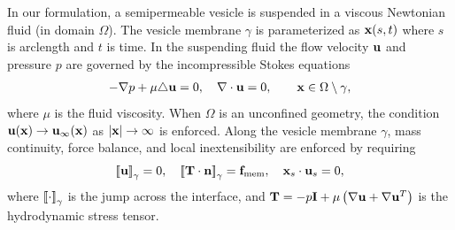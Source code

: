 \documentclass[prb,preprint,showpacs,preprintnumbers,amsmath,amssymb,longbibliography]{revtex4-1}
\begin{document}

In our formulation, a semipermeable vesicle is suspended in a viscous
Newtonian fluid (in domain $\Omega$).  The vesicle membrane $\gamma$ is
parameterized as $\mathbf{x}(s,t)$ where $s$ is arclength and $t$ is time. In
the suspending fluid the flow velocity $\mathbf{u}$ and pressure $p$ are
governed by the incompressible Stokes equations
\begin{align}
  \label{eqn:governing}
  -\nabla p + \mu \triangle \mathbf{u} = 0, \quad
  \nabla \cdot \mathbf{u} = 0, \qquad \mathbf{x} \in \Omega \setminus \gamma,
\end{align}
where $\mu$ is the fluid viscosity. When $\Omega$ is an unconfined
geometry, the condition $\mathbf{u}(\mathbf{x}) \rightarrow \mathbf{u}_\infty(\mathbf{x})$ as $|\mathbf{x}|
\rightarrow \infty$ is enforced. 
%
Along the vesicle membrane $\gamma$,
mass continuity, force balance, and local inextensibility are enforced
by requiring
\begin{align}
  \label{eqn:jump}
  \left[\!\left[ \mathbf{u} \right]\!\right]_\gamma = 0, \quad
  \left[\!\left[ \mathbf{T}\cdot\mathbf{n} \right]\!\right]_\gamma = \mathbf{f}_\mathrm{mem}, \quad
  \mathbf{x}_s \cdot \mathbf{u}_s = 0,
\end{align}
where 
$\left[\!\left[ \cdot \right]\!\right]_\gamma$ is the jump across the interface, and $\mathbf{T} = -p
\mathbf{I} + \mu \left(\nabla \mathbf{u} + \nabla \mathbf{u}^T \right)$ is the
hydrodynamic stress tensor.
\end{document}

